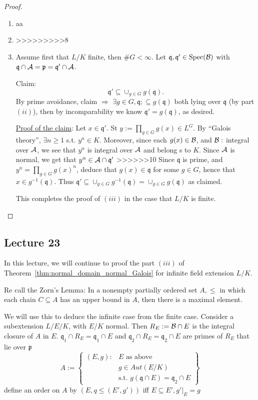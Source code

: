 \documentclass[11pt]{article}
\newcommand{\scp}{{\mathfrak p}}
\newcommand{\scq}{\mathfrak q}
\newcommand{\cala}{{\cal A}}
\newcommand{\calb}{{\cal B}}
\newcommand{\Lrta}{\Longrightarrow}
\begin{document}
\begin{proof}
\begin{enumerate}[label=(\roman*)]
\item aa
\item 
>>>>>>>>>8
\item Assume first that $L/K$ finite, then $\#G<\infty$. Let $\scq,\scq'\in \text{Spec}(\calb)$ with $\scq\cap\cala=\scp=\scq'\cap\cala$. 

Claim:
$$
\scq'\subseteq\cup_{g\in G}g(\scq).
$$
By prime avoidance, claim $\Lrta$ $\exists g\in G,\scq;\subseteq g(\scq)$ both lying over $\scq$ (by part $(ii)$), then by incomparability we know $\scq'=g(\scq)$, as desired.

\underline{Proof of the claim}: Let $x\in \scq'.$ St $y:=\prod_{g\in G}g(x)\in L^G$.
By ``Galois theory'', $\exists n\geq 1$ s.t. $y^n\in K$. Moreover, since each $g(x)\in\calb$, and $\calb:$ integral over $\cala$, we see that $y^n$ is integral over $\cala$ and belong s to $K$. Since $\cala$ is normal, we get that $y^n\in \cala\cap\scq'$
>>>>>>10
Since $\scq$ is prime, and $y^n=\prod_{g\in G}g(x)^n$, deduce that $g(x)\in\scq$ for some $g\in G$, hence that $x\in g^{-1}(\scq)$. Thus $\scq'\subseteq \cup_{g\in G}g^{-1}(\scq)=\cup_{g\in G}g(\scq)$ as claimed.

This completes the proof of $(iii)$ in the case that $L/K$ is finite.
\end{enumerate}
\end{proof}

\subsection{Lecture 23}
In this lecture, we will continue to proof the part $(iii)$ of Theorem~\ref{thm:normal_domain_normal_Galois} for infinite field extension $L/K$.

Re call the Zorn's Lemma: In a nonempty partially ordered set $A,\leq $ in which each chain $C\subseteq A$ has an upper bound in $A$, then there is a maximal element.

We will use this to deduce the infinite case from the finite case. Consider a subextension $L/E/K$, with $E/K$ normal. Then $R_E:=\calb\cap E$ is the integral closure of $A$ in $E$. $\scq_1\cap R_E=\scq_1\cap E$ and $\scq_2\cap R_E=\scq_2\cap E$ are primes of $R_E$ that lie over $\scp$
$$
A:=\left\{
\begin{aligned}
(E,g):& E \text{ as above }\\
& g\in Aut(E/K)\\
&\text{s.t. } g(\scq\cap E)=\scq_2\cap E
\end{aligned}
\right\}
$$
define an order on $A$ by $(E,q\leq (E',g'))$ iff $E\subseteq E', g'|_E=g$
\end{document}
